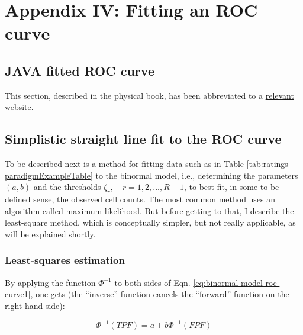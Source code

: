 \documentclass[
]{book}
\begin{document}
\hypertarget{binormal-model-curve-fitting-appendix-4}{%
\section{Appendix IV: Fitting an ROC curve}\label{binormal-model-curve-fitting-appendix-4}}

\hypertarget{java-fitted-roc-curve}{%
\subsection{JAVA fitted ROC curve}\label{java-fitted-roc-curve}}

This section, described in the physical book, has been abbreviated to a \href{http://www.rad.jhmi.edu/jeng/javarad/roc/JROCFITi.html}{relevant website}.

\hypertarget{simplistic-straight-line-fit-to-the-roc-curve}{%
\subsection{Simplistic straight line fit to the ROC curve}\label{simplistic-straight-line-fit-to-the-roc-curve}}

To be described next is a method for fitting data such as in Table \ref{tab:ratings-paradigmExampleTable} to the binormal model, i.e., determining the parameters \((a,b)\) and the thresholds \(\zeta_r , \quad r = 1, 2, ..., R-1\), to best fit, in some to-be-defined sense, the observed cell counts. The most common method uses an algorithm called maximum likelihood. But before getting to that, I describe the least-square method, which is conceptually simpler, but not really applicable, as will be explained shortly.

\hypertarget{least-squares-estimation}{%
\subsubsection{Least-squares estimation}\label{least-squares-estimation}}

By applying the function \(\Phi^{-1}\) to both sides of Eqn. \eqref{eq:binormal-model-roc-curve1}, one gets (the ``inverse'' function cancels the ``forward'' function on the right hand side):

\begin{equation*} 
\Phi^{-1}\left ( TPF \right ) = a + b \Phi^{-1}\left ( FPF \right )
\end{equation*}
\end{document}
